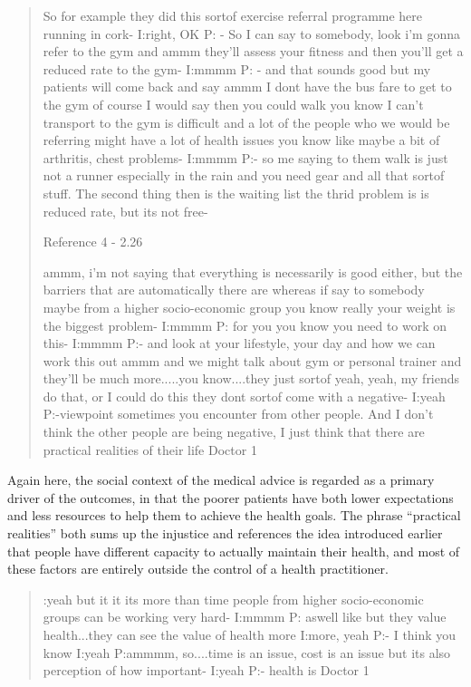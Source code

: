 \begin{quotation}
  So for example they did this sortof exercise referral programme here running in cork-
I:right, OK
P: - So I can say to somebody, look i'm gonna refer to the gym and ammm they'll assess your fitness  and then you'll get a reduced rate to the gym-
I:mmmm
P: - and that sounds good but my patients will come back and say ammm I dont have the bus fare to get to the gym of course I would say then you could walk you know I can't transport to the gym is difficult and a lot of the people who we would be referring might have a lot of health issues you know like maybe a bit of arthritis, chest problems-
I:mmmm
P:- so me saying to them walk is just not a runner especially in the rain and you need gear and all that sortof stuff. The second thing then is the waiting list the thrid problem is is reduced rate, but its not free-

Reference 4 - 2.26%

ammm, i'm not saying that everything is necessarily is good either, but the barriers that are automatically there are whereas if say to somebody maybe from a higher socio-economic group you know really your weight is the biggest problem-
I:mmmm
P: for you you know you need to work on this-
I:mmmm
P:- and look at your lifestyle, your day and how we can work this out ammm and we might talk about gym or personal trainer and they'll be much more.....you know....they just sortof yeah, yeah, my friends do that, or I could do this they dont sortof come with a negative-
I:yeah
P:-viewpoint sometimes you encounter from other people. And I don't think the other people are being negative, I just think that there are practical realities of their life
Doctor 1
\end{quotation}

Again here, the social context of the medical advice is regarded as a primary driver of the outcomes, in that the poorer patients have both lower expectations and less resources to help them to achieve the health goals. The phrase ``practical realities'' both sums up the injustice and references the idea introduced earlier that people have different capacity to actually maintain their health, and most of these factors are entirely outside the control of a health practitioner. 

\begin{quotation}
  :yeah but it it its more than time people from higher socio-economic groups can be working very hard-
I:mmmm
P: aswell like but they value health...they can see the value of health more
I:more, yeah
P:- I think you know
I:yeah
P:ammmm, so....time is an issue, cost is an issue but its also perception of how important-
I:yeah
P:- health is
Doctor 1
\end{quotation}

